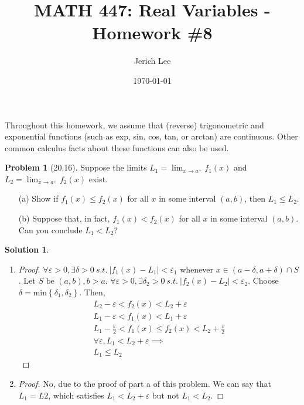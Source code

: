 \documentclass[12pt]{article}
\title{MATH 447: Real Variables - Homework \#8}
\author{Jerich Lee}
\date{\today}
\theoremstyle{definition} %
\newtheorem{solution}{Solution}
\newtheorem{problem}{Problem}
\theoremstyle{plain} %
\begin{document}
\maketitle
Throughout this homework, we assume that (reverse) trigonometric and exponential functions (such as exp, sin, cos, tan, or arctan) are continuous. Other common calculus facts about these functions can also be used.
\begin{problem}[20.16]
    Suppose the limits \( L_1 = \lim_{x \to a^+} f_1(x) \) and \( L_2 = \lim_{x \to a^+} f_2(x) \) exist.

\begin{enumerate}
    \item[(a)] Show if \( f_1(x) \leq f_2(x) \) for all \( x \) in some interval \( (a, b) \), then \( L_1 \leq L_2 \).
    \item[(b)] Suppose that, in fact, \( f_1(x) < f_2(x) \) for all \( x \) in some interval \( (a, b) \). Can you conclude \( L_1 < L_2 \)?
\end{enumerate}
\end{problem}
\begin{solution}
\begin{enumerate}
\item \begin{proof}
    \(\forall \varepsilon>0, \exists \delta >0 \ s.t. \ \left\vert f_1(x)-L_1 \right\vert <\varepsilon_1\) whenever \(x\in (a- \delta, a+\delta)\cap S\). Let \(S \text{ be }  (a,b), b>a\). \(\forall \varepsilon>0, \exists \delta_2 >0 \ s.t. \ \left\vert f_2(x)-L_2 \right\vert <\varepsilon_2\). Choose \(\delta = \text{min}\left\{ \delta_1, \delta_2 \right\}\). Then,
    \begin{align}
        L_2 - \varepsilon < f_2(x) < L_2 + \varepsilon \\[10pt] 
        L_1 - \varepsilon < f_1(x) < L_1 + \varepsilon \\[10pt] 
        L_1 - \frac{\varepsilon}{2} < f_1(x) \leq f_2(x) <L_2 +\frac{\varepsilon}{2} \\[10pt] 
        \forall \varepsilon, L_1 < L_2 + \varepsilon \implies \\[10pt] 
        L_1 \leq L_2
    \end{align} 
\end{proof}
\item \begin{proof}
    No, due to the proof of part a of this problem. We can say that \(L_1=L2\), which satisfies \(L_1<L_{2}+\varepsilon\) but not \(L_1 < L_2\). 
\end{proof}
\end{enumerate}    
\end{solution}
\end{document}

